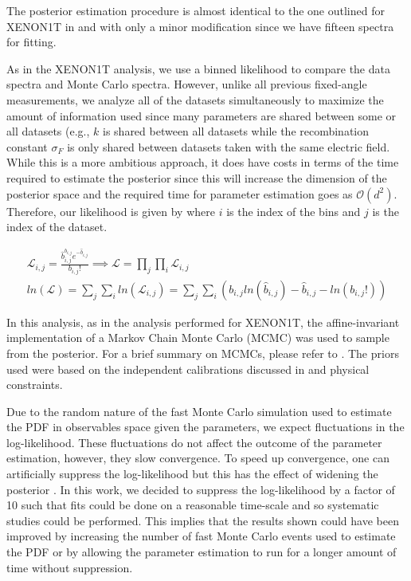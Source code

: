 The posterior estimation procedure is almost identical to the one outlined for XENON1T in  and  with only a minor modification since we have fifteen spectra for fitting.  

As in the XENON1T analysis, we use a binned likelihood to compare the data spectra and Monte Carlo spectra.  However, unlike all previous fixed-angle measurements, we analyze all of the datasets simultaneously to maximize the amount of information used since many parameters are shared between some or all datasets (e.g., $k$ is shared between all datasets while the recombination constant $\sigma_F$ is only shared between datasets taken with the same electric field.  While this is a more ambitious approach, it does have costs in terms of the time required to estimate the posterior since this will increase the dimension of the posterior space and the required time for parameter estimation goes as $\mathcal{O}(d^2)$.  Therefore, our likelihood is given by  where $i$ is the index of the bins and $j$ is the index of the dataset.


\begin{equation}
        \label{eqn:nerix_binned_likelihood}
        \begin{gathered}
                \mathcal{L}_{i,j} = \frac{\hat{b}_{i,j}^{b_{i,j}} e^{-\hat{b}_{i,j}}}{b_{i,j}!} \implies \mathcal{L} = \prod_j \prod_i \mathcal{L}_{i,j} \\ 
                ln(\mathcal{L}) = \sum_j \sum_i ln(\mathcal{L}_{i,j}) = \sum_j \sum_i ( b_{i,j} ln(\hat{b}_{i,j}) - \hat{b}_{i,j} - ln(b_{i,j}!) )
        \end{gathered}
\end{equation}


In this analysis, as in the analysis performed for XENON1T, the affine-invariant implementation of a Markov Chain Monte Carlo (MCMC) was used to sample from the posterior.  For a brief summary on MCMCs, please refer to .  The priors used were based on the independent calibrations discussed in  and physical constraints.

Due to the random nature of the fast Monte Carlo simulation used to estimate the PDF in observables space given the parameters, we expect fluctuations in the log-likelihood.  These fluctuations do not affect the outcome of the parameter estimation, however, they slow convergence.  To speed up convergence, one can artificially suppress the log-likelihood but this has the effect of widening the posterior \cite{anthony2017characterization}.  In this work, we decided to suppress the log-likelihood by a factor of 10 such that fits could be done on a reasonable time-scale and so systematic studies could be performed.  This implies that the results shown could have been improved by increasing the number of fast Monte Carlo events used to estimate the PDF or by allowing the parameter estimation to run for a longer amount of time without suppression. 


